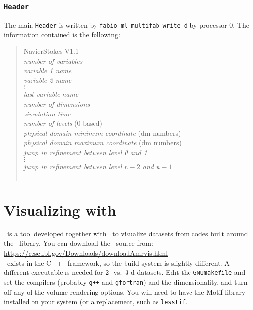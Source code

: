 \subsubsection{\tt Header}

The main {\tt Header} is written by {\tt fabio\_ml\_multifab\_write\_d} by
processor 0.  The information contained is the following:
\begin{quote}
NavierStokes-V1.1 \\
{\em number of variables} \\
{\em variable 1 name} \\
{\em variable 2 name} \\
$\vdots$ \\
{\em last variable name} \\
{\em number of dimensions} \\
{\em simulation time} \\
{\em number of levels} (0-based) \\
{\em physical domain minimum coordinate} (dm numbers) \\
{\em physical domain maximum coordinate} (dm numbers) \\
{\em jump in refinement between level 0 and 1} \\
$\vdots$ \\
{\em jump in refinement between level $n-2$ and $n-1$} \\
~\\

\end{quote}




\section{Visualizing with \amrvis}

\amrvis\ is a tool developed together with \boxlib\ to visualize datasets
from codes built around the \boxlib\ library.  You can download the
\amrvis\ source from: \\
\url{https://ccse.lbl.gov/Downloads/downloadAmrvis.html} \\

\amrvis\ exists in the C++ \boxlib\ framework, so the build system is
slightly different.  A different executable is needed for 2- vs.\ 3-d
datasets.  Edit the {\tt GNUmakefile} and set the compilers (probably
{\tt g++} and {\tt gfortran}) and the dimensionality, and turn off any
of the volume rendering options.  You will need to have the Motif library
installed on your system (or a replacement, such as {\tt lesstif}.  

